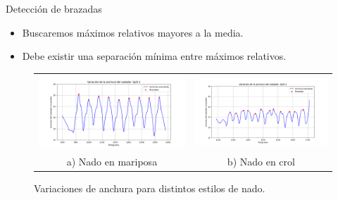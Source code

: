 \documentclass[11pt]{beamer}
\begin{document}
        \begin{frame}{Detección de brazadas}
            \begin{itemize}
                \item Buscaremos máximos relativos mayores a la media.
                \item Debe existir una separación mínima entre máximos relativos.
            \end{itemize}
            \begin{figure}[h!]
                \centering
                    \begin{tabular}{cc}
                        \includegraphics[scale=0.2]{imagenes/anchuras_calle_3_mariposa_YOLO.png} &
                        \includegraphics[scale=0.2]{imagenes/anchuras_calle_5_freestyle_YOLO.png}
                        \\ a) Nado en mariposa & b) Nado en crol
                    \end{tabular}
                \caption{Variaciones de anchura para distintos estilos de nado.}
                \label{fig:ejemplovariacionanchura}
            \end{figure}
        \end{frame}
        
\end{document}
